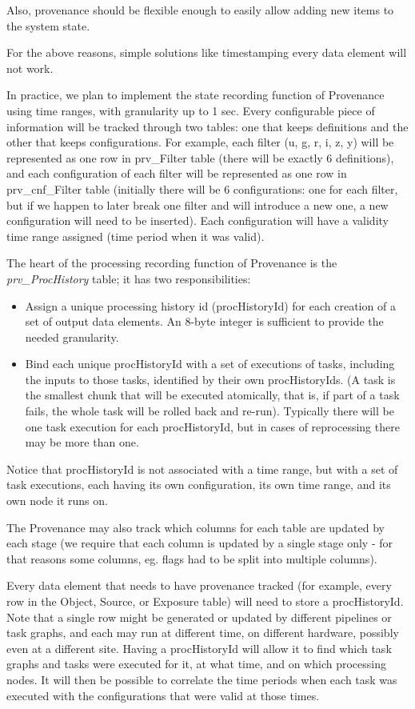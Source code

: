 \documentclass[DM,toc]{lsstdoc}
\begin{document}
Also, provenance should be flexible enough to easily allow adding new items to the system state.

For the above reasons, simple solutions like timestamping every data element will not work.

In practice, we plan to implement the state recording function of Provenance using time ranges, with granularity up to 1 sec. Every configurable piece of information will be tracked through two tables: one that keeps definitions and the other that keeps configurations. For example, each filter (u, g, r, i, z, y) will be represented as one row in prv\_Filter table (there will be exactly 6 definitions), and each configuration of each filter will be represented as one row in prv\_cnf\_Filter table (initially there will be 6 configurations: one for each filter, but if we happen to later break one filter and will introduce a new one, a new configuration will need to be inserted). Each configuration will have a validity time range assigned (time period when it was valid).

The heart of the processing recording function of Provenance is the \textit{prv\_ProcHistory} table; it has two responsibilities:

\begin{itemize}
  \item Assign a unique processing history id (procHistoryId) for each creation of a set of output data elements. An 8-byte integer is sufficient to provide the needed granularity.
  \item Bind each unique procHistoryId with a set of executions of tasks, including the inputs to those tasks, identified by their own procHistoryIds. (A task is the smallest chunk that will be executed atomically, that is, if part of a task fails, the whole task will be rolled back and re-run). Typically there will be one task execution for each procHistoryId, but in cases of reprocessing there may be more than one.
\end{itemize}

Notice that procHistoryId is not associated with a time range, but with a set of task executions, each having its own configuration, its own time range, and its own node it runs on.

The Provenance may also track which columns for each table are updated by each stage (we require that each column is updated by a single stage only - for that reasons some columns, eg. flags had to be split into multiple columns).

Every data element that needs to have provenance tracked (for example, every row in the Object, Source, or Exposure table) will need to store a procHistoryId. Note that a single row might be generated or updated by different pipelines or task graphs, and each may run at different time, on different hardware, possibly even at a different site. Having a procHistoryId will allow it to find which task graphs and tasks were executed for it, at what time, and on which processing nodes. It will then be possible to correlate the time periods when each task was executed with the configurations that were valid at those times.
\end{document}

